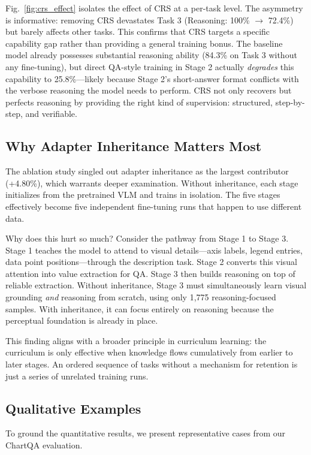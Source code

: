 ﻿\documentclass[journal]{IEEEtran}
\newcommand{\crs}{CRS}
\begin{document}
Fig.~\ref{fig:crs_effect} isolates the effect of \crs{} at a per-task level. The asymmetry is informative: removing \crs{} devastates Task 3 (Reasoning: 100\% $\rightarrow$ 72.4\%) but barely affects other tasks. This confirms that \crs{} targets a specific capability gap rather than providing a general training bonus. The baseline model already possesses substantial reasoning ability (84.3\% on Task 3 without any fine-tuning), but direct QA-style training in Stage 2 actually \emph{degrades} this capability to 25.8\%---likely because Stage 2's short-answer format conflicts with the verbose reasoning the model needs to perform. \crs{} not only recovers but perfects reasoning by providing the right kind of supervision: structured, step-by-step, and verifiable.

\subsection{Why Adapter Inheritance Matters Most}
The ablation study singled out adapter inheritance as the largest contributor (+4.80\%), which warrants deeper examination. Without inheritance, each stage initializes from the pretrained VLM and trains in isolation. The five stages effectively become five independent fine-tuning runs that happen to use different data.

Why does this hurt so much? Consider the pathway from Stage 1 to Stage 3. Stage 1 teaches the model to attend to visual details---axis labels, legend entries, data point positions---through the description task. Stage 2 converts this visual attention into value extraction for QA. Stage 3 then builds reasoning on top of reliable extraction. Without inheritance, Stage 3 must simultaneously learn visual grounding \emph{and} reasoning from scratch, using only 1,775 reasoning-focused samples. With inheritance, it can focus entirely on reasoning because the perceptual foundation is already in place.

This finding aligns with a broader principle in curriculum learning: the curriculum is only effective when knowledge flows cumulatively from earlier to later stages. An ordered sequence of tasks without a mechanism for retention is just a series of unrelated training runs.

\subsection{Qualitative Examples}
To ground the quantitative results, we present representative cases from our ChartQA evaluation.
\end{document}

